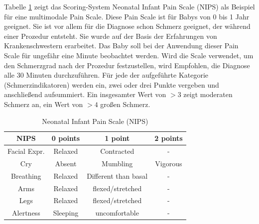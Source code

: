 Tabelle \ref{tab:nips} zeigt das Scoring-System \glqq Neonatal Infant Pain Scale\grqq{} (NIPS) als Beispiel für eine multimodale Pain Scale. Diese Pain Scale ist für Babys von 0 bis 1 Jahr geeignet. Sie ist vor allem für die Diagnose schon Schmerz geeignet, der während einer Prozedur entsteht. Sie wurde auf der Basis der Erfahrungen von Krankenschwestern erarbeitet. Das Baby soll bei der Anwendung dieser Pain Scale für ungefähr eine Minute beobachtet werden. Wird die Scale verwendet, um den Schmerzgrad nach der Prozedur festzustellen, wird Empfohlen, die Diagnose alle 30 Minuten durchzuführen. Für jede der aufgeführte Kategorie (Schmerzindikatoren) werden ein, zwei oder drei Punkte vergeben und anschließend aufsummiert. Ein insgesamter Wert von $>3$ zeigt moderaten Schmerz an, ein Wert von $>4$ großen Schmerz.\cite{nips} \cite[S. 98]{painInNeonates}

\begin{table}[h]
	\footnotesize
	\centering
	\caption{Neonatal Infant Pain Scale (NIPS) \cite{nips}}
	\label{tab:nips}
	\begin{tabular}{@{}cccc@{}}
		\toprule
		\textbf{NIPS}     & \textbf{0 points} & \textbf{1 point}     & \textbf{2 points} \\ \midrule
		Facial Expr. & Relaxed           & Contracted           & -                 \\
		Cry               & Absent            & Mumbling             & Vigorous          \\
		Breathing         & Relaxed           & Different than basal & -                 \\
		Arms              & Relaxed           & flexed/stretched     & -                 \\
		Legs              & Relaxed           & flexed/stretched     & -                 \\
		Alertness         & Sleeping          & uncomfortable        & -                 \\ \bottomrule
	\end{tabular}
\end{table}


